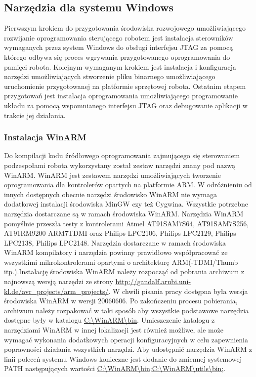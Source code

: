 \subsection{Narzędzia dla systemu Windows}
Pierwszym krokiem do przygotowania środowiska rozwojowego umożliwiającego
rozwijanie oprogramowania sterującego robotem jest instalacja sterowników
wymaganych przez system Windows do obsługi interfejsu JTAG za pomocą którego
odbywa się proces wgrywania przygotowanego oprogramowania do pamięci robota.
Kolejnym wymaganym krokiem jest instalacja i konfiguracja narzędzi
umożliwiających stworzenie pliku binarnego umożliwiającego uruchomienie
przygotowanej na platformie sprzętowej robota. Ostatnim etapem przygotowań jest
instalacja oprogramowania umożliwiającego programowanie układu za pomocą
wspomnianego interfejsu JTAG oraz debugowanie aplikacji w trakcie jej działania.
\subsubsection{Instalacja WinARM}
Do kompilacji kodu źródłowego oprogramowania zajmującego się sterowaniem
podzespołami robota wykorzystany został zestaw narzędzi znany pod nazwą WinARM.
WinARM jest zestawem narzędzi umożliwiających tworzenie oprogramowania dla
kontrolerów opartych na platformie ARM. W odróżnieniu od innych dostępnych
obecnie narzędzi środowisko WinARM nie wymaga dodatkowej instalacji środowiska
MinGW czy też Cygwina. Wszystkie potrzebne narzędzia dostarczane są w ramach
środowiska WinARM. Narzędzia WinARM pomyślnie przeszła testy z kontrolerami Atmel
AT91SAM7S64, AT91SAM7S256, AT91RM9200 ARM7TDMI oraz Philips LPC2106, Philips
LPC2129, Philips LPC2138, Philips LPC2148. Narzędzia dostarczane w ramach
środowiska WinARM kompilatory i narzędzia powinny prawidłowo współpracować ze
wszystkimi mikrokontrolerami opartymi o architekturę ARM(-TDMI/Thumb
itp.).\newline \newline Instalację środowiska WinARM należy rozpocząć od pobrania
archiwum z najnowszą wersją narzędzi ze strony
\url{http://gandalf.arubi.uni-kl.de/avr_projects/arm_projects/}. W chwili pisania
pracy dostępna była wersja środowiska WinARM w wersji 20060606. Po zakończeniu
procesu pobierania, archiwum należy rozpakować w taki sposób aby wszystkie
podstawowe narzędzia dostępne były w katalogu \url{C:\WinARM\bin}. Umieszczenie
katalogu z narzędziami WinARM w innej lokalizacji jest również możliwe, ale może
wymagać wykonania dodatkowych operacji konfiguracyjnych w celu zapewnienia
poprawności działania wszystkich narzędzi. Aby udostępnić narzędzia WinARM z
linii poleceń systemu Windows konieczne jest dodanie do zmiennej systemowej PATH
następujących wartości \url{C:\WinARM\bin;C:\WinARM\utils\bin;}.
